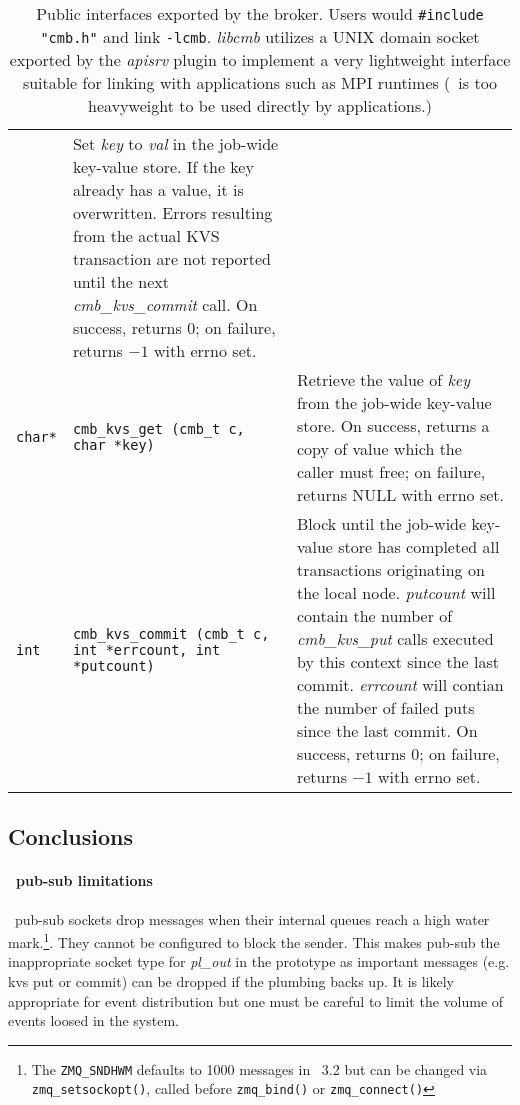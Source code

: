 \begin{table}
\begin{tabular}{|p{0.7cm}p{5cm}|p{9cm}|}
  & Set {\em key} to {\em val} in the job-wide key-value store.
    If the key already has a value, it is overwritten.
    Errors resulting from the actual KVS transaction are not reported
    until the next {\em cmb\_kvs\_commit} call.
    On success, returns $0$; on failure, returns $-1$ with errno set.\\
{\tt {char*}}
  & {\tt cmb\_kvs\_get (cmb\_t c, char {*key})}
  & Retrieve the value of {\em key} from the job-wide key-value store.
    On success, returns a copy of value which the caller must free;
    on failure, returns NULL with errno set.\\
{\tt int}
  & {\tt cmb\_kvs\_commit (cmb\_t c, int *errcount, int *putcount)}
  & Block until the job-wide key-value store has completed all transactions
    originating on the local node.  {\em putcount} will contain the number
    of {\em cmb\_kvs\_put} calls executed by this context since the last commit.
    {\em errcount} will contian the number of failed puts since the last commit.
    On success, returns $0$; on failure, returns $-1$ with errno set.\\
\hline
\end{tabular}
\caption{Public interfaces exported by the broker.  Users would
{\tt \#include "cmb.h"} and link {\tt -lcmb}.  {\em libcmb} utilizes
a UNIX domain socket exported by the {\em apisrv} plugin to implement
a very lightweight interface suitable for linking with applications such
as MPI runtimes (\zMQ\ is too heavyweight to be used directly by applications.)}
\label{tab:cmbapi}
\end{table}

\subsection{Conclusions}

\paragraph{\zMQ\ pub-sub limitations} \zMQ\ pub-sub sockets drop messages when
their internal queues reach a high water mark.\footnote{The {\tt ZMQ\_SNDHWM}
defaults to 1000 messages in \zMQ\ 3.2 but can be changed via
{\tt zmq\_setsockopt()}, called before {\tt zmq\_bind()} or
{\tt zmq\_connect()}}.
They cannot be configured to block the sender.  This makes pub-sub
the inappropriate socket type for {\em pl\_out} in the prototype as
important messages (e.g. kvs put or commit) can be dropped if the
plumbing backs up.
It is likely appropriate for event distribution but one must be careful
to limit the volume of events loosed in the system.

